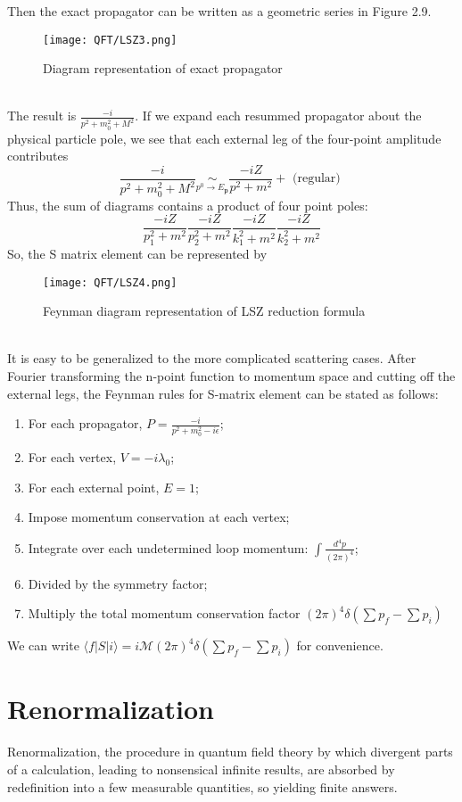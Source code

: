 Then the exact propagator can be written as a geometric series in
Figure 2.9.
\begin{figure}[!h]
\centering
\texttt{[image: QFT/LSZ3.png]}
\caption{Diagram representation of exact propagator}
\end{figure}\\
The result is $\frac{-i}{p^2 + m_0^2 + M^2}$. If we expand each resummed propagator about the physical particle pole, we see that each external leg of the four-point amplitude contributes
\[\frac{-i}{p^2 + m_0^2 + M^2} \underset{p^0 \to E_{\bm{p}}}{\sim} \frac{-iZ}{p^2+m^2} + \mbox{ (regular) }\]
Thus, the sum of diagrams contains a product of four point poles:
\[\frac{-iZ}{p_1^2 + m^2} \frac{-iZ}{p_2^2 + m^2} \frac{-iZ}{k_1^2 + m^2} \frac{-iZ}{k_2^2 + m^2}\]
So, the S matrix element can be represented by 
\begin{figure}[!h]
\centering
\texttt{[image: QFT/LSZ4.png]}
\caption{Feynman diagram representation of LSZ reduction formula}
\end{figure}\\
It is easy to be generalized to the more complicated scattering cases. After Fourier transforming the n-point function to momentum space and cutting off the external legs, the Feynman rules for S-matrix element can be stated as follows:
\begin{enumerate}
\item For each propagator, $P = \frac{-i}{p^2 + m_0^2 -i\epsilon}$;
\item For each vertex, $V = -i\lambda_0$;
\item For each external point, $E=1$;
\item Impose momentum conservation at each vertex;
\item Integrate over each undetermined loop momentum: $\int \frac{d^4p}{(2\pi)^4}$;
\item Divided by the symmetry factor;
\item Multiply the total momentum conservation factor $(2\pi)^4 \delta(\sum p_f - \sum p_i)$ 
\end{enumerate}
We can write $\langle f | S | i \rangle = i \mathcal{M} (2\pi)^4 \delta(\sum p_f - \sum p_i)$ for convenience.

\section{Renormalization}
\noindent
Renormalization, the procedure in quantum field theory by which divergent parts of a calculation, leading to nonsensical infinite results, are absorbed by redefinition into a few measurable quantities, so yielding finite answers.

